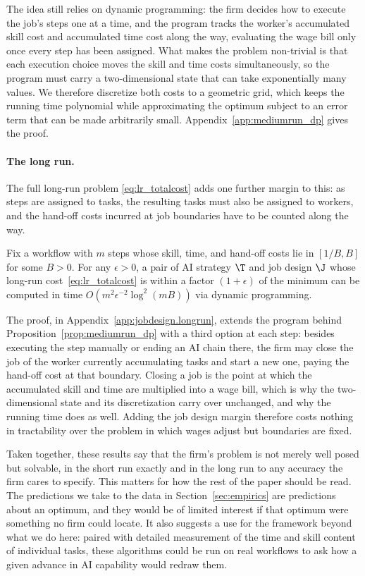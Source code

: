 The idea still relies on dynamic programming: the firm decides how to execute the job's steps one at a time, and the program tracks the worker's accumulated skill cost and accumulated time cost along the way, evaluating the wage bill only once every step has been assigned.
What makes the problem non-trivial is that each execution choice moves the skill and time costs simultaneously, so the program must carry a two-dimensional state that can take exponentially many values.
We therefore discretize both costs to a geometric grid, which keeps the running time polynomial while approximating the optimum subject to an error term that can be made arbitrarily small.
Appendix~\ref{app:mediumrun_dp} gives the proof.

\paragraph{The long run.}
The full long-run problem \eqref{eq:lr_totalcost} adds one further margin to this: as steps are assigned to tasks, the resulting tasks must also be assigned to workers, and the hand-off costs incurred at job boundaries have to be counted along the way.

\begin{proposition}
\label{prop:totalcost_optimization_dp}
Fix a workflow with $m$ steps whose skill, time, and hand-off costs lie in $[1/B, B]$ for some $B > 0$.
For any $\epsilon > 0$, a pair of AI strategy $\T$ and job design $\J$ whose long-run cost~\eqref{eq:lr_totalcost} is within a factor $(1+\epsilon)$ of the minimum can be computed in time $O(m^2 \epsilon^{-2} \log^2(mB))$ via dynamic programming.
\end{proposition}

The proof, in Appendix~\ref{app:jobdesign.longrun}, extends the program behind Proposition~\ref{prop:mediumrun_dp} with a third option at each step: besides executing the step manually or ending an AI chain there, the firm may close the job of the worker currently accumulating tasks and start a new one, paying the hand-off cost at that boundary.
Closing a job is the point at which the accumulated skill and time are multiplied into a wage bill, which is why the two-dimensional state and its discretization carry over unchanged, and why the running time does as well.
Adding the job design margin therefore costs nothing in tractability over the problem in which wages adjust but boundaries are fixed.

Taken together, these results say that the firm's problem is not merely well posed but solvable, in the short run exactly and in the long run to any accuracy the firm cares to specify.
This matters for how the rest of the paper should be read.
The predictions we take to the data in Section~\ref{sec:empirics} are predictions about an optimum, and they would be of limited interest if that optimum were something no firm could locate.
It also suggests a use for the framework beyond what we do here: paired with detailed measurement of the time and skill content of individual tasks, these algorithms could be run on real workflows to ask how a given advance in AI capability would redraw them.
